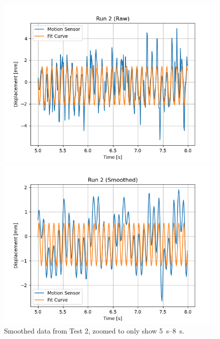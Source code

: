 \documentclass[12 pt]{report}
\begin{document}
\begin{figure}[htbp]
    \centering
    \begin{minipage}{0.45\textwidth}
        \centering
        \includegraphics[width=1.0\textwidth]{images/Graphs/Run_2-Raw-Zoomed} %
        \caption{Raw data from Test \num{2}, zoomed to only show \qtyrange{5}{8}{\s}.}
        \label{fig:run_2-raw-zoomed}
    \end{minipage}\hfill
    \begin{minipage}{0.45\textwidth}
        \centering
        \includegraphics[width=1.0\textwidth]{images/Graphs/Run_2-Smoothed-Zoomed} %
        \caption{Smoothed data from Test \num{2}, zoomed to only show \qtyrange{5}{8}{\s}.}
        \label{fig:run_2-smoothed-zoomed}
    \end{minipage}
\end{figure}
\end{document}
